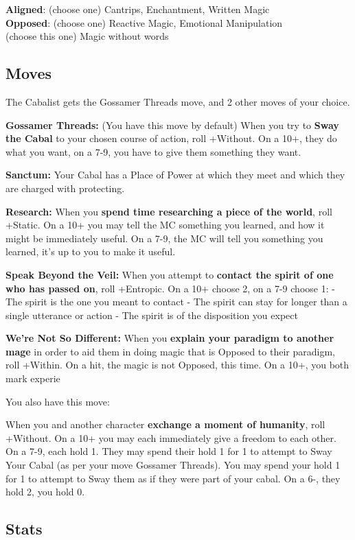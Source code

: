 \documentclass[
]{memoir}
\begin{document}
\textbf{Aligned}: (choose one) Cantrips, Enchantment, Written Magic\\
\textbf{Opposed}: (choose one) Reactive Magic, Emotional Manipulation\\
(choose this one) Magic without words

\hypertarget{moves}{%
\subsection{Moves}\label{moves}}

The Cabalist gets the Gossamer Threads move, and 2 other moves of your
choice.

\textbf{Gossamer Threads:} (You have this move by default) When you try
to \textbf{Sway the Cabal} to your chosen course of action, roll
+Without. On a 10+, they do what you want, on a 7-9, you have to give
them something they want.

\textbf{Sanctum:} Your Cabal has a Place of Power at which they meet and
which they are charged with protecting.

\textbf{Research:} When you \textbf{spend time researching a piece of
the world}, roll +Static. On a 10+ you may tell the MC something you
learned, and how it might be immediately useful. On a 7-9, the MC will
tell you something you learned, it's up to you to make it useful.

\textbf{Speak Beyond the Veil:} When you attempt to \textbf{contact the
spirit of one who has passed on}, roll +Entropic. On a 10+ choose 2, on
a 7-9 choose 1: - The spirit is the one you meant to contact - The
spirit can stay for longer than a single utterance or action - The
spirit is of the disposition you expect

\textbf{We're Not So Different:} When you \textbf{explain your paradigm
to another mage} in order to aid them in doing magic that is Opposed to
their paradigm, roll +Within. On a hit, the magic is not Opposed, this
time. On a 10+, you both mark experie

You also have this move:

When you and another character \textbf{exchange a moment of humanity},
roll +Without. On a 10+ you may each immediately give a freedom to each
other. On a 7-9, each hold 1. They may spend their hold 1 for 1 to
attempt to Sway Your Cabal (as per your move Gossamer Threads). You may
spend your hold 1 for 1 to attempt to Sway them as if they were part of
your cabal. On a 6-, they hold 2, you hold 0.

\hypertarget{stats-1}{%
\subsection{Stats}\label{stats-1}}
\end{document}
